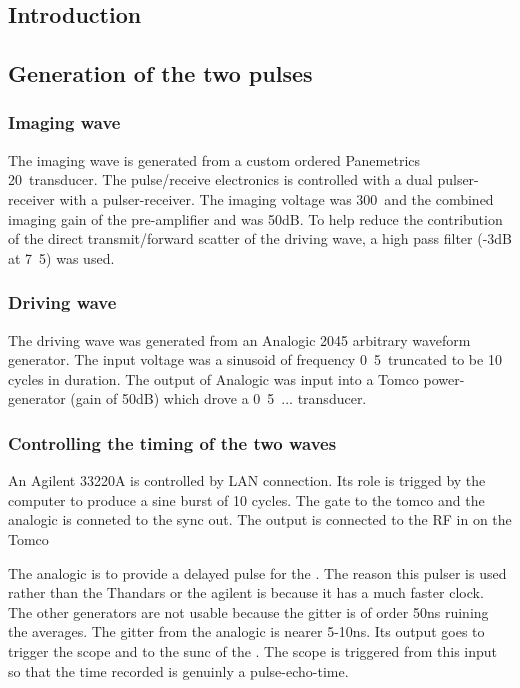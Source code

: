 \subsection{Introduction}



\subsection{Generation of the two pulses}
\subsubsection{Imaging wave}
The imaging wave is generated from a custom ordered Panemetrics \unit{20}\mega\hertz\
transducer.
The pulse/receive electronics is controlled 
with a \JsrUltrasonics {} dual pulser-receiver
with a  pulser-receiver.
The imaging voltage was \unit{300}\volt\ and the combined imaging gain 
of the pre-amplifier and \DPR500 was \unit{50}dB.
To help reduce the contribution of the direct transmit/forward scatter of
the driving wave, a high pass filter (-\unit{3}dB at \unit{7.5}\mega\hertz)
was used.

\subsubsection{Driving wave}
The driving wave was generated from an  Analogic 2045 arbitrary waveform generator.
The input voltage was a sinusoid of frequency \unit{0.5}\mega\hertz\ 
truncated to be 10 cycles in duration. 
The output of Analogic was input into a Tomco power-generator (gain of \unit{50}dB)
which drove a \unit{0.5}\mega\hertz\ ... transducer.

\subsubsection{Controlling the timing of the two waves}
An Agilent  33220A is controlled by LAN connection.  Its role is trigged by the computer to produce a sine burst of 10 cycles.  The gate to the tomco and the analogic is conneted to the sync out.  The output is connected to the RF in on the Tomco

The analogic is to provide a delayed pulse for the .  The reason this pulser is used rather than the Thandars or the agilent is because it has a much faster clock.  The other generators are not usable because the gitter is of order 50ns  ruining the averages.  The gitter from the analogic is nearer 5-10ns.  Its output goes to trigger the scope and to the sunc of the \DPR500.  The scope is triggered from this input so that the time recorded is genuinly a pulse-echo-time.


